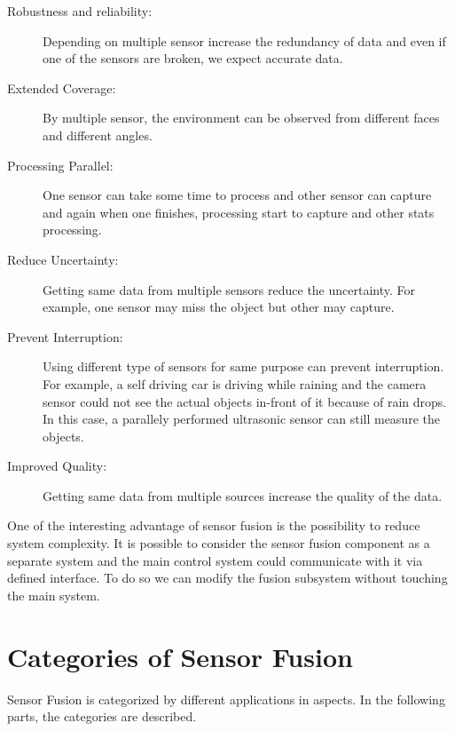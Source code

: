 \begin{description}
    \item[Robustness and reliability:] Depending on multiple sensor increase the redundancy of data and even if one of the sensors are broken, we expect accurate data.
    \item[Extended Coverage:] By multiple sensor, the environment can be observed from different faces and different angles.
    \item[Processing Parallel:] One sensor can take some time to process and other sensor can capture and again when one finishes, processing start to capture and other stats processing.
    \item[Reduce Uncertainty:] Getting same data from multiple sensors reduce the uncertainty. For example, one sensor may miss the object but other may capture.
    \item[Prevent Interruption:] Using different type of sensors for same purpose can prevent interruption. For example, a self driving car is driving while raining and the camera sensor could not see the actual objects in-front of it because of rain drops. In this case, a parallely performed ultrasonic sensor can still measure the objects.
    \item[Improved Quality:] Getting same data from multiple sources increase the quality of the data.
\end{description}
One of the interesting advantage of sensor fusion is the possibility to reduce system complexity\cite{Wilfried2002}. It is possible to consider the sensor fusion component as a separate system and the main control system could communicate with it via defined interface. To do so we can modify the fusion subsystem without touching the main system\cite{Wilfried2002}.

\section{Categories of Sensor Fusion}
Sensor Fusion is categorized by different applications in aspects. In the following parts, the categories are described.

